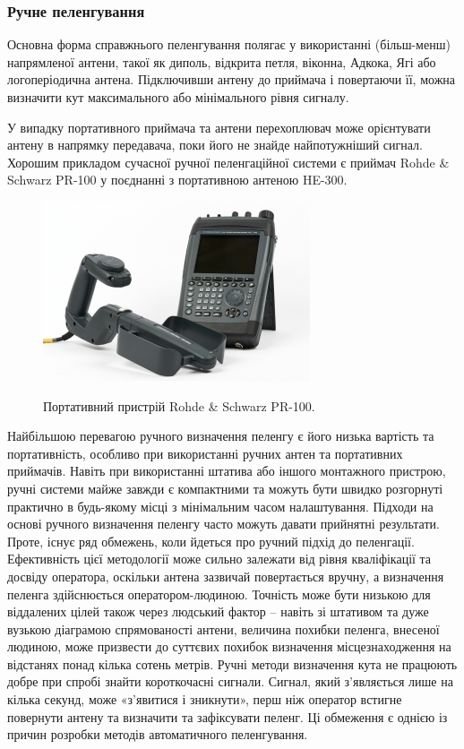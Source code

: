\documentclass{article}
\begin{document}
\subsubsection{Ручне пеленгування}
Основна форма справжнього пеленгування полягає у використанні (більш-менш) напрямленої антени, такої як диполь, відкрита петля, віконна, Адкока, Ягі або логоперіодична антена. Підключивши антену до приймача і повертаючи її, можна визначити кут максимального або мінімального рівня сигналу.

У випадку портативного приймача та антени перехоплювач може орієнтувати антену в напрямку передавача, поки його не знайде найпотужніший сигнал. Хорошим прикладом сучасної ручної пеленгаційної системи є приймач Rohde \& Schwarz PR-100 у поєднанні з портативною антеною HE-300. 

\begin{figure}[H]
\centering
{\includegraphics[width=0.6\linewidth]{images/rds-rs-100.jpg}}
\caption{\label{fig:rds:pr100}Портативний пристрій Rohde \& Schwarz PR-100.}
\end{figure}

Найбільшою перевагою ручного визначення пеленгу є його низька вартість та портативність, особливо при використанні ручних антен та портативних приймачів. Навіть при використанні штатива або іншого монтажного пристрою, ручні системи майже завжди є компактними та можуть бути швидко розгорнуті практично в будь-якому місці з мінімальним часом налаштування. Підходи на основі ручного визначення пеленгу часто можуть давати прийнятні результати. Проте, існує ряд обмежень, коли йдеться про ручний підхід до пеленгації. Ефективність цієї методології може сильно залежати від рівня кваліфікації та досвіду оператора, оскільки антена зазвичай повертається вручну, а визначення пеленга здійснюється оператором-людиною. Точність може бути низькою для віддалених цілей також через людський фактор – навіть зі штативом та дуже вузькою діаграмою спрямованості антени, величина похибки пеленга, внесеної людиною, може призвести до суттєвих похибок визначення місцезнаходження на відстанях понад кілька сотень метрів. Ручні методи визначення кута не працюють добре при спробі знайти короткочасні сигнали. Сигнал, який з'являється лише на кілька секунд, може «з'явитися і зникнути», перш ніж оператор встигне повернути антену та визначити та зафіксувати пеленг. Ці обмеження є однією із причин розробки методів автоматичного пеленгування.
\end{document}
